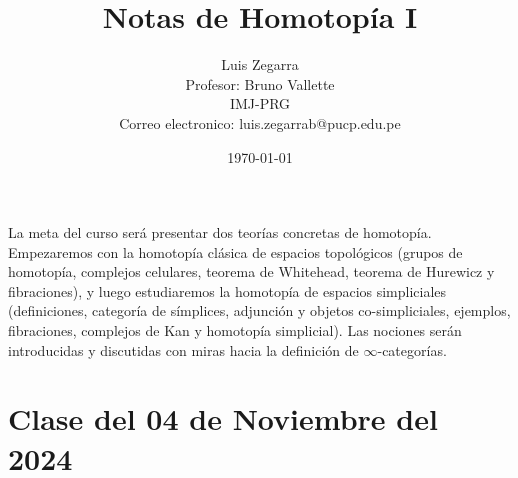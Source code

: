 \documentclass[11pt]{article}
\title{Notas de Homotopía I}
\author{Luis Zegarra \\ Profesor: Bruno Vallette \\ IMJ-PRG \\ Correo electronico: luis.zegarrab@pucp.edu.pe}
\date{\today}
\begin{document}
 

\maketitle

La meta del curso será presentar dos teorías concretas de homotopía. Empezaremos con la homotopía clásica de espacios topológicos (grupos de homotopía, complejos celulares, teorema de Whitehead, teorema de Hurewicz y fibraciones), y luego estudiaremos la homotopía de espacios simpliciales (definiciones, categoría de símplices, adjunción y objetos co-simpliciales, ejemplos, fibraciones, complejos de Kan y homotopía simplicial). Las nociones serán introducidas y discutidas con miras hacia la definición de $\infty$-categorías.

\tableofcontents

\newpage

\section{Clase del 04 de Noviembre del 2024}


\end{document}
